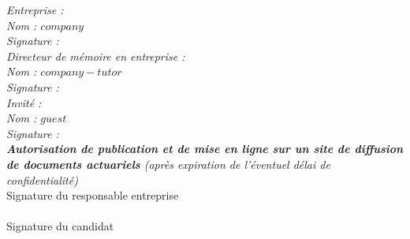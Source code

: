 \begin{titlepage}
\begin{minipage}[t]{0.53\textwidth}
\begin{tabular}[t]{@{}p{6.5cm} >{\raggedleft\arraybackslash}m{2cm}}
\end{tabular}
\end{minipage}%
\begin{minipage}[t]{0.47\textwidth}
\textit{Entreprise :} \\
\textit{Nom : $company$} \\[0.3cm]
\textit{Signature :} \\[0.5cm]
\textit{Directeur de mémoire en entreprise :} \\
\textit{Nom : $company-tutor$} \\[0.3cm]
\textit{Signature :} \\[0.5cm]
\textit{Invité :} \\
\textit{Nom : $guest$} \\[0.3cm]
\textit{Signature :} \\[0.5cm]
\textit{\textbf{Autorisation de publication et de mise en ligne sur un site de
diffusion de documents actuariels} (après expiration de l'éventuel délai de
confidentialité)}\\[0.2cm]
Signature du responsable entreprise \\
\framebox[7cm]{\rule{0mm}{1.5cm}} \\
Signature du candidat \\
\framebox[7cm]{\rule{0mm}{1.5cm}}
\end{minipage}

\end{titlepage}
\restoregeometry

\cleardoublepage
{}